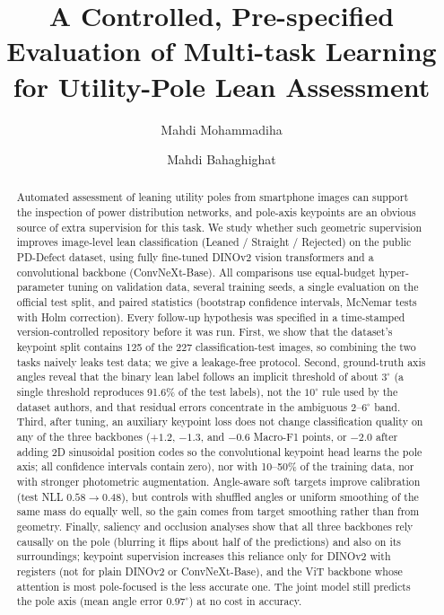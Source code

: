 \documentclass[11pt]{article}
\title{A Controlled, Pre-specified Evaluation of Multi-task Learning\\ for Utility-Pole Lean Assessment}
\author[1]{Mahdi Mohammadiha}
\author[1,*]{Mahdi Bahaghighat}
\affil[1]{Department of Computer Engineering, Imam Khomeini International University, Qazvin, Iran}
\affil[*]{Corresponding author: \texttt{bahaghighat@eng.ikiu.ac.ir}}
\date{}
\begin{document}
\maketitle

\begin{abstract}
Automated assessment of leaning utility poles from smartphone images can support the inspection of power
distribution networks, and pole-axis keypoints are an obvious source of extra supervision for this task.
We study whether such geometric supervision improves image-level lean classification (Leaned / Straight /
Rejected) on the public PD-Defect dataset, using fully fine-tuned DINOv2 vision transformers and a convolutional backbone (ConvNeXt-Base). All comparisons
use equal-budget hyper-parameter tuning on validation data, several training seeds, a single evaluation on
the official test split, and paired statistics (bootstrap confidence intervals, McNemar tests with Holm
correction). Every follow-up hypothesis was specified in a time-stamped version-controlled repository before it was run.
First, we show that the dataset's keypoint split contains 125 of the 227 classification-test images, so
combining the two tasks naively leaks test data; we give a leakage-free protocol. Second, ground-truth axis
angles reveal that the binary lean label follows an implicit threshold of about $3^\circ$ (a single
threshold reproduces 91.6\% of the test labels), not the $10^\circ$ rule used by the dataset authors, and that
residual errors concentrate in the ambiguous 2--$6^\circ$ band. Third, after tuning, an auxiliary keypoint
loss does not change classification quality on any of the three backbones ($+1.2$, $-1.3$, and $-0.6$ Macro-F1 points, or $-2.0$ after adding 2D sinusoidal position codes so the convolutional keypoint head learns the pole axis; all
confidence intervals contain zero), nor with 10--50\% of the training data, nor with stronger photometric
augmentation. Angle-aware soft targets improve calibration (test NLL $0.58 \rightarrow 0.48$), but controls
with shuffled angles or uniform smoothing of the same mass do equally well, so the gain comes from target
smoothing rather than from geometry. Finally, saliency and occlusion analyses show that all three backbones rely causally on the pole
(blurring it flips about half of the predictions) and also on its surroundings; keypoint supervision increases
this reliance only for DINOv2 with registers (not for plain DINOv2 or ConvNeXt-Base), and the ViT backbone whose attention is most pole-focused is the less
accurate one. The joint model still predicts the pole axis (mean angle error $0.97^\circ$) at no
cost in accuracy.
\end{abstract}
\end{document}
